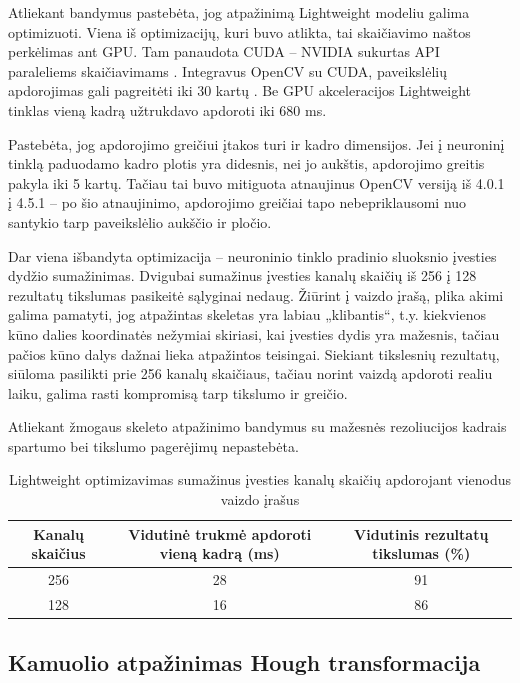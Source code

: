 \documentclass{VUMIFPSbakalaurinis}
\begin{document}
Atliekant bandymus pastebėta, jog atpažinimą Lightweight modeliu galima optimizuoti. Viena iš optimizacijų, kuri buvo atlikta, tai skaičiavimo naštos perkėlimas ant GPU. Tam panaudota CUDA – NVIDIA sukurtas API paraleliems skaičiavimams \cite{cuda}. Integravus OpenCV su CUDA, paveikslėlių apdorojimas gali pagreitėti iki 30 kartų \cite{opencv-cuda}. Be GPU akceleracijos Lightweight tinklas vieną kadrą užtrukdavo apdoroti iki 680 ms. 

Pastebėta, jog apdorojimo greičiui įtakos turi ir kadro dimensijos. Jei į neuroninį tinklą paduodamo kadro plotis yra didesnis, nei jo aukštis, apdorojimo greitis pakyla iki 5 kartų. Tačiau tai buvo mitiguota atnaujinus OpenCV versiją iš 4.0.1 į 4.5.1 – po šio atnaujinimo, apdorojimo greičiai tapo nebepriklausomi nuo santykio tarp paveikslėlio aukščio ir pločio. 

Dar viena išbandyta optimizacija – neuroninio tinklo pradinio sluoksnio įvesties dydžio sumažinimas. Dvigubai sumažinus įvesties kanalų skaičių iš 256 į 128 rezultatų tikslumas pasikeitė sąlyginai nedaug. Žiūrint į vaizdo įrašą, plika akimi galima pamatyti, jog atpažintas skeletas yra labiau „klibantis“, t.y. kiekvienos kūno dalies koordinatės nežymiai skiriasi, kai įvesties dydis yra mažesnis, tačiau pačios kūno dalys dažnai lieka atpažintos teisingai. Siekiant tikslesnių rezultatų, siūloma pasilikti prie 256 kanalų skaičiaus, tačiau norint vaizdą apdoroti realiu laiku, galima rasti kompromisą tarp tikslumo ir greičio. 

Atliekant žmogaus skeleto atpažinimo bandymus su mažesnės rezoliucijos kadrais spartumo bei tikslumo pagerėjimų nepastebėta.

\begin{table}[H]\footnotesize
	\centering
	\caption{Lightweight optimizavimas sumažinus įvesties kanalų skaičių apdorojant vienodus vaizdo įrašus}
	{\begin{tabular}{|c|c|c|} \hline
			\textbf{Kanalų skaičius} & \textbf{Vidutinė trukmė apdoroti vieną kadrą (ms)} & \textbf{Vidutinis rezultatų tikslumas (\%)} \\
			\hline
			256  & 28    & 91       \\
			\hline
			128  & 16    & 86       \\
			\hline
	\end{tabular}}
	\label{tab:openposevslightweight}
\end{table}

\subsection{Kamuolio atpažinimas Hough transformacija}
\end{document}
